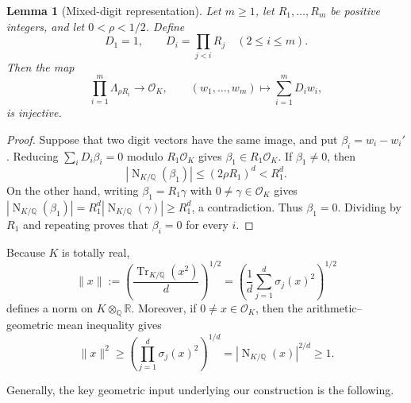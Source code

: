 \documentclass[11pt]{article}
\theoremstyle{plain}
\newtheorem{lemma}[theorem]{Lemma}
\theoremstyle{remark}
\newcommand{\Q}{\mathbb Q}
\newcommand{\OK}{\mathcal O_K}
\newcommand{\Tr}{\operatorname{Tr}_{K/\Q}}
\newcommand{\Nm}{\operatorname{N}_{K/\Q}}
\begin{document}
\begin{lemma}[Mixed-digit representation]\label{lem:digits}
Let $m\geq1$, let $R_1,\ldots,R_m$ be positive integers, and let
$0<\rho<1/2$.  Define
\[
  D_1=1,
  \qquad
  D_i=\prod_{j<i}R_j\quad(2\leq i\leq m).
\]
Then the map
\[
  \prod_{i=1}^m\Lambda_{\rho R_i}\longrightarrow\OK,
  \qquad
  (w_1,\ldots,w_m)\longmapsto\sum_{i=1}^mD_iw_i,
\]
is injective.
\end{lemma}

\begin{proof}
Suppose that two digit vectors have the same image, and put
$\beta_i=w_i-w_i'$.  Reducing
$\sum_iD_i\beta_i=0$ modulo $R_1\OK$ gives
$\beta_1\in R_1\OK$.  If $\beta_1\neq0$, then
\[
  |\Nm(\beta_1)|
  \leq(2\rho R_1)^d<R_1^d.
\]
On the other hand, writing $\beta_1=R_1\gamma$ with
$0\neq\gamma\in\OK$ gives
$|\Nm(\beta_1)|=R_1^d|\Nm(\gamma)|\geq R_1^d$, a contradiction.
Thus $\beta_1=0$.  Dividing by $R_1$ and repeating proves that
$\beta_i=0$ for every $i$.
\end{proof}

Because $K$ is totally real,
\[
  \lVert x\rVert
  :=\left(\frac{\Tr(x^2)}{d}\right)^{1/2}
  =\left(\frac1d\sum_{j=1}^d\sigma_j(x)^2\right)^{1/2}
\]
defines a norm on $K\otimes_{\Q}\mathbb R$.  Moreover, if
$0\neq x\in\OK$, then the arithmetic--geometric mean inequality gives
\begin{equation}\label{eq:minimum-norm}
  \lVert x\rVert^2
  \geq\left(\prod_{j=1}^d\sigma_j(x)^2\right)^{1/d}
  =|\Nm(x)|^{2/d}\geq1.
\end{equation}

Generally, the key geometric input underlying our construction is the following. 
\end{document}
